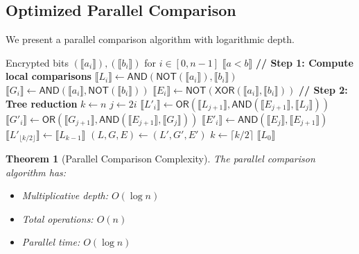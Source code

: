 \documentclass[11pt,a4paper]{article}
\newtheorem{theorem}{Theorem}[section]
\begin{document}
\subsection{Optimized Parallel Comparison}

We present a parallel comparison algorithm with logarithmic depth.

\begin{algorithm}
\caption{Parallel Less-Than Comparison}
\begin{algorithmic}[1]
\Require Encrypted bits $(\llbracket a_i \rrbracket), (\llbracket b_i \rrbracket)$ for $i \in [0, n-1]$
\Ensure $\llbracket a < b \rrbracket$
\State \textbf{// Step 1: Compute local comparisons}
    \State $\llbracket L_i \rrbracket \gets \textsf{AND}(\textsf{NOT}(\llbracket a_i \rrbracket), \llbracket b_i \rrbracket)$ 
    \State $\llbracket G_i \rrbracket \gets \textsf{AND}(\llbracket a_i \rrbracket, \textsf{NOT}(\llbracket b_i \rrbracket))$ 
    \State $\llbracket E_i \rrbracket \gets \textsf{NOT}(\textsf{XOR}(\llbracket a_i \rrbracket, \llbracket b_i \rrbracket))$ 
\EndFor
\State \textbf{// Step 2: Tree reduction}
\State $k \gets n$
        \State $j \gets 2i$
        \State $\llbracket L'_i \rrbracket \gets \textsf{OR}(\llbracket L_{j+1} \rrbracket, \textsf{AND}(\llbracket E_{j+1} \rrbracket, \llbracket L_j \rrbracket))$
        \State $\llbracket G'_i \rrbracket \gets \textsf{OR}(\llbracket G_{j+1} \rrbracket, \textsf{AND}(\llbracket E_{j+1} \rrbracket, \llbracket G_j \rrbracket))$
        \State $\llbracket E'_i \rrbracket \gets \textsf{AND}(\llbracket E_j \rrbracket, \llbracket E_{j+1} \rrbracket)$
    \EndFor
        \State $\llbracket L'_{\lfloor k/2 \rfloor} \rrbracket \gets \llbracket L_{k-1} \rrbracket$
    \EndIf
    \State $(L, G, E) \gets (L', G', E')$
    \State $k \gets \lceil k/2 \rceil$
\EndWhile
\State \Return $\llbracket L_0 \rrbracket$
\end{algorithmic}
\end{algorithm}

\begin{theorem}[Parallel Comparison Complexity]
The parallel comparison algorithm has:
\begin{itemize}
    \item Multiplicative depth: $O(\log n)$
    \item Total operations: $O(n)$
    \item Parallel time: $O(\log n)$
\end{itemize}
\end{theorem}
\end{document}
